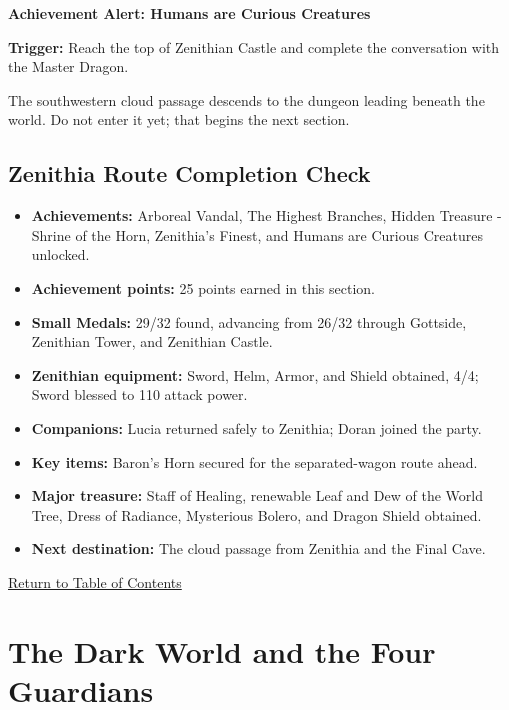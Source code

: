 \documentclass[
  american,
  10pt,
  letterpaper,
  oneside,
  open=any]{scrreprt}
\providecommand{\tightlist}{%
  \setlength{\itemsep}{0pt}\setlength{\parskip}{0pt}}
\begin{document}
\begin{achievementalert}

\textbf{Achievement Alert: Humans are Curious Creatures}

\textbf{Trigger:} Reach the top of Zenithian Castle and complete the
conversation with the Master Dragon.

\end{achievementalert}

The southwestern cloud passage descends to the dungeon leading beneath
the world. Do not enter it yet; that begins the next section.

\section{Zenithia Route Completion
Check}\label{zenithia-route-completion-check}

\begin{itemize}
\tightlist
\item
  \textbf{Achievements:} Arboreal Vandal, The Highest Branches, Hidden
  Treasure - Shrine of the Horn, Zenithia's Finest, and Humans are
  Curious Creatures unlocked.
\item
  \textbf{Achievement points:} 25 points earned in this section.
\item
  \textbf{Small Medals:} 29/32 found, advancing from 26/32 through
  Gottside, Zenithian Tower, and Zenithian Castle.
\item
  \textbf{Zenithian equipment:} Sword, Helm, Armor, and Shield obtained,
  4/4; Sword blessed to 110 attack power.
\item
  \textbf{Companions:} Lucia returned safely to Zenithia; Doran joined
  the party.
\item
  \textbf{Key items:} Baron's Horn secured for the separated-wagon route
  ahead.
\item
  \textbf{Major treasure:} Staff of Healing, renewable Leaf and Dew of
  the World Tree, Dress of Radiance, Mysterious Bolero, and Dragon
  Shield obtained.
\item
  \textbf{Next destination:} The cloud passage from Zenithia and the
  Final Cave.
\end{itemize}

\hyperref[table-of-contents]{Return to Table of Contents}

\chapter{The Dark World and the Four
Guardians}\label{the-dark-world-and-the-four-guardians}
\end{document}
